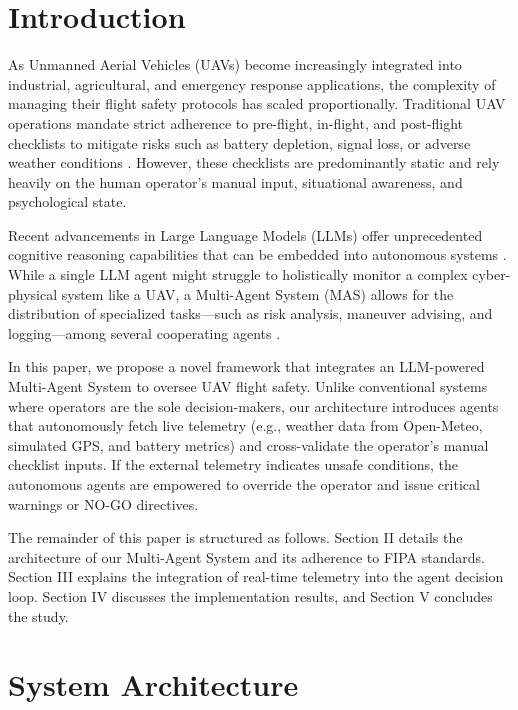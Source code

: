 \documentclass[conference]{IEEEtran}
\begin{document}
\section{Introduction}
As Unmanned Aerial Vehicles (UAVs) become increasingly integrated into industrial, agricultural, and emergency response applications, the complexity of managing their flight safety protocols has scaled proportionally. Traditional UAV operations mandate strict adherence to pre-flight, in-flight, and post-flight checklists to mitigate risks such as battery depletion, signal loss, or adverse weather conditions \cite{b1}. However, these checklists are predominantly static and rely heavily on the human operator's manual input, situational awareness, and psychological state.

Recent advancements in Large Language Models (LLMs) offer unprecedented cognitive reasoning capabilities that can be embedded into autonomous systems \cite{b2}. While a single LLM agent might struggle to holistically monitor a complex cyber-physical system like a UAV, a Multi-Agent System (MAS) allows for the distribution of specialized tasks—such as risk analysis, maneuver advising, and logging—among several cooperating agents \cite{b3}. 

In this paper, we propose a novel framework that integrates an LLM-powered Multi-Agent System to oversee UAV flight safety. Unlike conventional systems where operators are the sole decision-makers, our architecture introduces agents that autonomously fetch live telemetry (e.g., weather data from Open-Meteo, simulated GPS, and battery metrics) and cross-validate the operator's manual checklist inputs. If the external telemetry indicates unsafe conditions, the autonomous agents are empowered to override the operator and issue critical warnings or NO-GO directives.

The remainder of this paper is structured as follows. Section II details the architecture of our Multi-Agent System and its adherence to FIPA standards. Section III explains the integration of real-time telemetry into the agent decision loop. Section IV discusses the implementation results, and Section V concludes the study.

\section{System Architecture}
\end{document}
